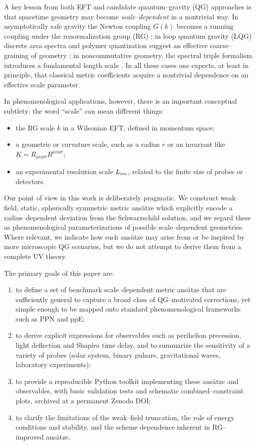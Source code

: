 \documentclass[11pt,a4paper]{article}
\begin{document}
A key lesson from both EFT and candidate quantum--gravity (QG) approaches is that spacetime geometry may become \emph{scale--dependent} in a nontrivial way. In asymptotically safe gravity the Newton coupling $G(k)$ becomes a running coupling under the renormalization group (RG) \cite{ReuterSaueressig2012}; in loop quantum gravity (LQG) discrete area spectra and polymer quantization suggest an effective coarse--graining of geometry \cite{Rovelli2004,AshtekarBojowald2005}; in noncommutative geometry, the spectral triple formalism introduces a fundamental length scale \cite{Connes1994,SeibergWitten1999,Nicolini2006,Ansoldi2008}. In all these cases one expects, at least in principle, that classical metric coefficients acquire a nontrivial dependence on an effective scale parameter.

In phenomenological applications, however, there is an important conceptual subtlety: the word ``scale'' can mean different things:
\begin{itemize}[leftmargin=*]
\item the RG scale $k$ in a Wilsonian EFT, defined in momentum space;
\item a geometric or curvature scale, such as a radius $r$ or an invariant like $K=R_{\mu\nu\rho\sigma}R^{\mu\nu\rho\sigma}$;
\item an experimental resolution scale $L_{\rm res}$, related to the finite size of probes or detectors.
\end{itemize}
Our point of view in this work is deliberately pragmatic. We construct weak--field, static, spherically symmetric metric ans\"atze which explicitly encode a radius--dependent deviation from the Schwarzschild solution, and we regard these as phenomenological parameterizations of possible scale--dependent geometries. Where relevant, we indicate how such ans\"atze may arise from or be inspired by more microscopic QG scenarios, but we do not attempt to derive them from a complete UV theory.

The primary goals of this paper are:
\begin{enumerate}[leftmargin=*]
\item to define a set of benchmark scale--dependent metric ans\"atze that are sufficiently general to capture a broad class of QG--motivated corrections, yet simple enough to be mapped onto standard phenomenological frameworks such as PPN and ppE;
\item to derive explicit expressions for observables such as perihelion precession, light deflection and Shapiro time delay, and to summarize the sensitivity of a variety of probes (solar system, binary pulsars, gravitational waves, laboratory experiments);
\item to provide a reproducible Python toolkit implementing these ans\"atze and observables, with basic validation tests and schematic combined--constraint plots, archived at a permanent Zenodo DOI;
\item to clarify the limitations of the weak--field truncation, the role of energy conditions and stability, and the scheme dependence inherent in RG--improved ans\"atze.
\end{enumerate}
\end{document}
